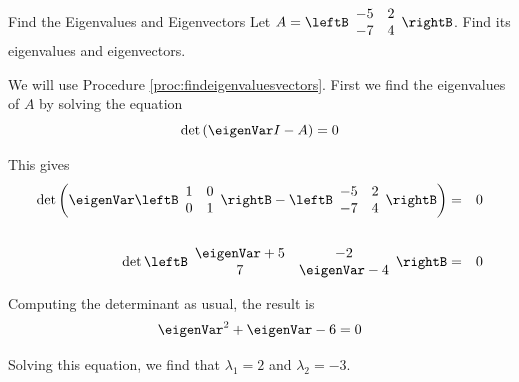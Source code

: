 \begin{example}{Find the Eigenvalues and Eigenvectors}\label{exa:findeigenvectors2x2}
Let $A = \leftB \begin{array}{rr}
-5 & 2 \\
-7 & 4 
\end{array} \rightB$. Find its eigenvalues and eigenvectors. 
\end{example}

\begin{solution}
We will use Procedure \ref{proc:findeigenvaluesvectors}. First we find the eigenvalues of $A$ by solving the equation
\[
\det \left( \eigenVar I - A \right) =0
\]

This gives
\begin{eqnarray*}
\det \left( \eigenVar \leftB \begin{array}{rr}
1 & 0 \\
0 & 1 
\end{array} \rightB 
- 
\leftB \begin{array}{rr}
-5 & 2 \\
-7 & 4
\end{array} \rightB \right) &=& 0 \\
\\
\det \leftB \begin{array}{cc}
\eigenVar+5 & -2 \\
7 & \eigenVar-4 
\end{array} \rightB &=& 0 
\end{eqnarray*}

Computing the determinant as usual, the result is
\[
\eigenVar^2 + \eigenVar - 6 = 0
\]

Solving this equation, we find that $\lambda_1 = 2$ and $\lambda_2 = -3$. 


\end{solution}
